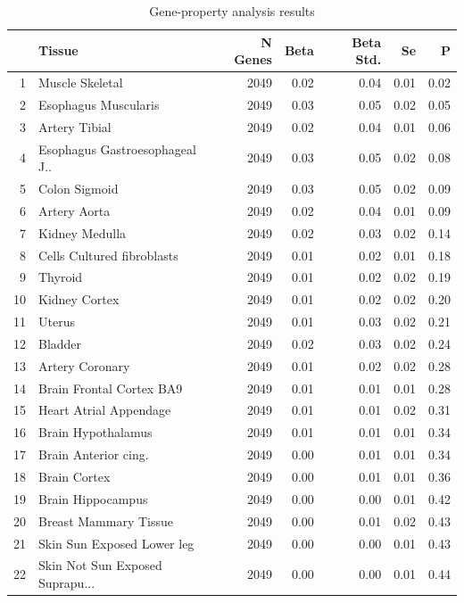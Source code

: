 \documentclass{article}
\begin{document}
\begin{table}[h!]
\vspace{-7.5em}%
\renewcommand{\thetable}{S\arabic{table}}
\centering
\caption{Gene-property analysis results}
\begin{tabular}{rlrrrrr}
  \hline
 & Tissue & N Genes & Beta & Beta Std. & Se & P \\ 
  \hline
1 & Muscle Skeletal & 2049 & 0.02 & 0.04 & 0.01 & 0.02 \\ 
  2 & Esophagus Muscularis & 2049 & 0.03 & 0.05 & 0.02 & 0.05 \\ 
  3 & Artery Tibial  & 2049 & 0.02 & 0.04 & 0.01 & 0.06 \\ 
  4 & Esophagus Gastroesophageal J.. & 2049 & 0.03 & 0.05 & 0.02 & 0.08 \\ 
  5 & Colon Sigmoid & 2049 & 0.03 & 0.05 & 0.02 & 0.09 \\ 
  6 & Artery Aorta  & 2049 & 0.02 & 0.04 & 0.01 & 0.09 \\ 
  7 & Kidney Medulla & 2049 & 0.02 & 0.03 & 0.02 & 0.14 \\ 
  8 & Cells Cultured fibroblasts & 2049 & 0.01 & 0.02 & 0.01 & 0.18 \\ 
  9 & Thyroid & 2049 & 0.01 & 0.02 & 0.02 & 0.19 \\ 
  10 & Kidney Cortex & 2049 & 0.01 & 0.02 & 0.02 & 0.20 \\ 
  11 & Uterus & 2049 & 0.01 & 0.03 & 0.02 & 0.21 \\ 
  12 & Bladder  & 2049 & 0.02 & 0.03 & 0.02 & 0.24 \\ 
  13 & Artery Coronary & 2049 & 0.01 & 0.02 & 0.02 & 0.28 \\ 
  14 & Brain Frontal Cortex BA9 & 2049 & 0.01 & 0.01 & 0.01 & 0.28 \\ 
  15 & Heart Atrial Appendage & 2049 & 0.01 & 0.01 & 0.02 & 0.31 \\ 
  16 & Brain Hypothalamus & 2049 & 0.01 & 0.01 & 0.01 & 0.34 \\ 
  17 & Brain Anterior cing. & 2049 & 0.00 & 0.01 & 0.01 & 0.34 \\ 
  18 & Brain Cortex & 2049 & 0.00 & 0.01 & 0.01 & 0.36 \\ 
  19 & Brain Hippocampus & 2049 & 0.00 & 0.00 & 0.01 & 0.42 \\ 
  20 & Breast Mammary Tissue & 2049 & 0.00 & 0.01 & 0.02 & 0.43 \\ 
  21 & Skin Sun Exposed Lower leg & 2049 & 0.00 & 0.00 & 0.01 & 0.43 \\ 
  22 & Skin Not Sun Exposed Suprapu... & 2049 & 0.00 & 0.00 & 0.01 & 0.44 \\ 

\end{tabular}
\end{table}
\end{document}
